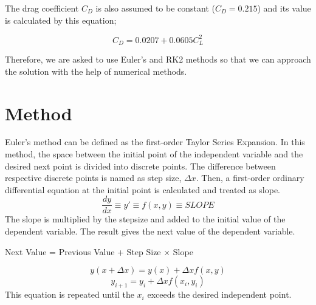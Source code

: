 \documentclass[letterpaper,12pt]{article}
\begin{document}
The drag coefficient $C_D$ is also assumed to be constant ($C_D = 0.215$) and its value is 
calculated by this equation;

\begin{equation}
        C_D = 0.0207 + 0.0605C_L^{2}
\end{equation}
        
Therefore, we are asked to use Euler's and RK2 methods so that we can approach the
solution with the help of numerical methods.


\section{Method}
Euler's method can be defined as the first-order Taylor Series Expansion. In this method, the space between
the initial point of the independent variable and the desired next point is divided into discrete points. The 
difference between respective discrete points is named as step size, $\Delta x$. Then, a first-order ordinary
differential equation at the initial point is calculated and treated as slope.
\begin{equation}
\frac{dy}{dx} \equiv y \prime \equiv f(x,y) \equiv SLOPE
\end{equation}
The slope is multiplied by the stepsize
and added to the initial value of the dependent variable. The result gives the next value of the dependent variable.

\begin{center}
Next Value = Previous Value + Step Size $\times $ Slope
\end{center}
\begin{equation}
y(x + \Delta x ) = y(x) + \Delta x f(x,y)
\end{equation}
\begin{equation}
y_{i+1} = y_i + \Delta x f(x_i , y_i)
\label{eq:eul}
\end{equation}
This equation is repeated until the $x_i$ exceeds the desired independent point.
\end{document}
